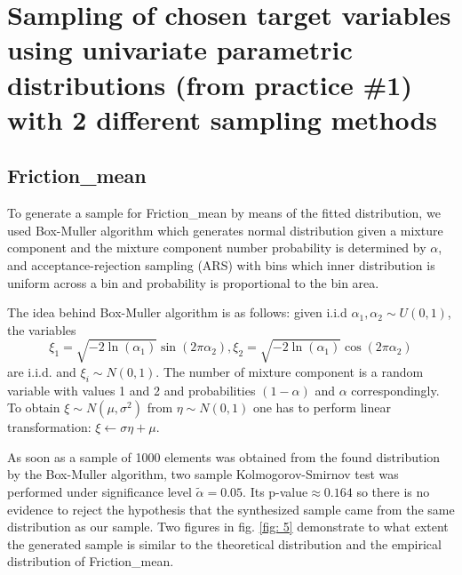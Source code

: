 \documentclass[12pt, bachelor, substylefile = algo_title.rtx]{disser}
\theoremstyle{definition}
\begin{document}
\section{Sampling of chosen target variables using univariate parametric distributions
(from practice \#1) with 2 different sampling methods}
\subsection*{Friction\_mean}
To generate a sample for Friction\_mean by means of the fitted distribution, we used Box-Muller algorithm which generates normal distribution given a mixture component and the mixture component number probability is determined by $\alpha$, and acceptance-rejection sampling (ARS) with bins which inner distribution is uniform across a bin and probability is proportional to the bin area.

The idea behind Box-Muller algorithm is as follows: given i.i.d $\alpha_1, \alpha_2 \sim U(0,1)$, the variables
\[ \xi_1 = \sqrt{-2\ln (\alpha_1)}\sin(2\pi \alpha_2),  \xi_2 = \sqrt{-2\ln (\alpha_1)}\cos(2\pi \alpha_2) \]
are i.i.d. and $\xi_i \sim N(0, 1)$. The number of mixture component is a random variable with values 1 and 2 and probabilities $(1-\alpha)$ and $\alpha$ correspondingly. To obtain $\xi \sim N(\mu, \sigma^2)$ from $\eta \sim N(0, 1)$ one has to perform linear transformation: $\xi \gets \sigma \eta + \mu$. 

As soon as a sample of 1000 elements was obtained from the found distribution by the Box-Muller algorithm, two sample Kolmogorov-Smirnov test was performed under significance level $\widetilde{\alpha} = 0.05$. Its p-value$ \approx 0.164$ so there is no evidence to reject the hypothesis that the synthesized sample came from the same distribution as our sample. Two figures in fig. \ref{fig: 5} demonstrate to what extent the generated sample is similar to the theoretical distribution and the empirical distribution of Friction\_mean.
\end{document}
